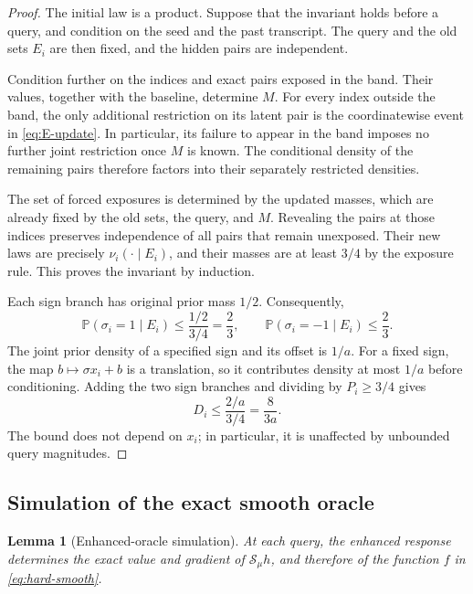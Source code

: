 \documentclass[11pt]{article}
\newcommand{\Prob}{\mathbb{P}}
\newcommand{\cS}{\mathcal{S}}
\newtheorem{lemma}[lemma]{Lemma}
\theoremstyle{definition}
\theoremstyle{remark}
\begin{document}
\begin{proof}
The initial law is a product.  Suppose that the invariant holds before
a query, and condition on the seed and the past transcript.  The query
and the old sets $E_i$ are then fixed, and the hidden pairs are
independent.

Condition further on the indices and exact pairs exposed in the band.
Their values, together with the baseline, determine $M$.  For every
index outside the band, the only additional restriction on its latent
pair is the coordinatewise event in \cref{eq:E-update}.  In particular,
its failure to appear in the band imposes no further joint restriction
once $M$ is known.  The conditional density of the remaining pairs
therefore factors into their separately restricted densities.

The set of forced exposures is determined by the updated masses, which
are already fixed by the old sets, the query, and $M$.  Revealing the
pairs at those indices preserves independence of all pairs that remain
unexposed.  Their new laws are precisely
$\nu_i(\cdot\mid E_i)$, and their masses are at least $3/4$ by the
exposure rule.  This proves the invariant by induction.

Each sign branch has original prior mass $1/2$.  Consequently,
\[
 \Prob(\sigma_i=1\mid E_i)\le\frac{1/2}{3/4}=\frac23,
 \qquad
 \Prob(\sigma_i=-1\mid E_i)\le\frac23.
\]
The joint prior density of a specified sign and its offset is $1/a$.
For a fixed sign, the map $b\mapsto\sigma x_i+b$ is a translation, so
it contributes density at most $1/a$ before conditioning.  Adding the
two sign branches and dividing by $P_i\ge3/4$ gives
\[
 D_i\le\frac{2/a}{3/4}=\frac{8}{3a}.
\]
The bound does not depend on $x_i$; in particular, it is unaffected by
unbounded query magnitudes.
\end{proof}

\subsection{Simulation of the exact smooth oracle}

\begin{lemma}[Enhanced-oracle simulation]
\label{lem:simulation}
At each query, the enhanced response determines the exact value and
gradient of $\cS_\mu h$, and therefore of the function $f$ in
\cref{eq:hard-smooth}.
\end{lemma}
\end{document}
